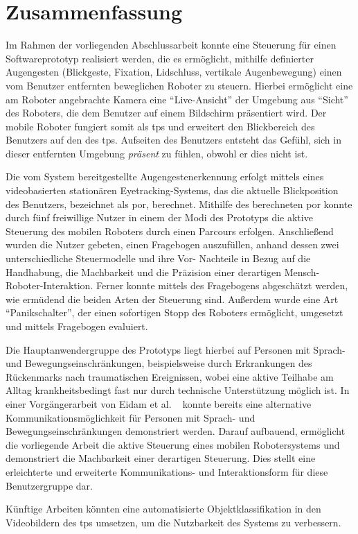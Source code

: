 \chapter*{Zusammenfassung}
\vspace*{-2.5em}
Im Rahmen der vorliegenden Abschlussarbeit konnte eine Steuerung für einen Softwareprototyp realisiert werden, die es ermöglicht, mithilfe definierter Augengesten (Blickgeste, Fixation, Lidschluss, vertikale Augenbewegung) einen vom Benutzer entfernten beweglichen Roboter zu steuern. Hierbei ermöglicht eine am Roboter angebrachte Kamera eine \enquote{Live-Ansicht} der Umgebung aus \enquote{Sicht} des Roboters, die dem Benutzer auf einem Bildschirm präsentiert wird. Der mobile Roboter fungiert somit als \acf{tps} und erweitert den Blickbereich des Benutzers auf den des \acs{tps}. Aufseiten des Benutzers entsteht das Gefühl, sich in dieser entfernten Umgebung \textit{präsent} zu fühlen, obwohl er dies nicht ist. 

Die vom System bereitgestellte Augengestenerkennung erfolgt mittels eines videobasierten stationären Eyetracking-Systems, das die aktuelle Blickposition des Benutzers, bezeichnet als \acf{por}, berechnet. Mithilfe des berechneten \acs{por} konnte durch fünf freiwillige Nutzer in einem der Modi des Prototyps die aktive Steuerung des mobilen Roboters durch einen Parcours erfolgen. Anschließend wurden die Nutzer gebeten, einen Fragebogen auszufüllen, anhand dessen zwei unterschiedliche Steuermodelle und ihre Vor- \bzw Nachteile in Bezug auf die Handhabung, die Machbarkeit und die Präzision einer derartigen Mensch-Roboter-Interaktion. Ferner konnte mittels des Fragebogens abgeschätzt werden, wie ermüdend die beiden Arten der Steuerung sind. Außerdem wurde eine Art \enquote{Panikschalter}, der einen sofortigen Stopp des Roboters ermöglicht, umgesetzt und mittels Fragebogen evaluiert.
 
Die Hauptanwendergruppe des Prototyps liegt hierbei auf Personen mit Sprach- und Bewegungseinschränkungen, beispielsweise durch Erkrankungen des Rückenmarks nach traumatischen Ereignissen, wobei eine aktive Teilhabe am Alltag krankheitsbedingt fast nur durch technische Unterstützung möglich ist. In einer Vorgängerarbeit von Eidam et al. \vgl~\cite{Eidam2015,Eidam2016} konnte bereits eine alternative Kommunikationsmöglichkeit für Personen mit Sprach- und Bewegungseinschränkungen demonstriert werden. Darauf aufbauend, ermöglicht die vorliegende Arbeit die aktive Steuerung eines mobilen Robotersystems und demonstriert die Machbarkeit einer derartigen Steuerung. Dies stellt eine erleichterte und erweiterte Kommunikations- und Interaktionsform für diese Benutzergruppe dar. 

Künftige Arbeiten könnten eine automatisierte Objektklassifikation in den Videobildern des \acs{tps} umsetzen, um die Nutzbarkeit des Systems zu verbessern.  

\restoregeometry
